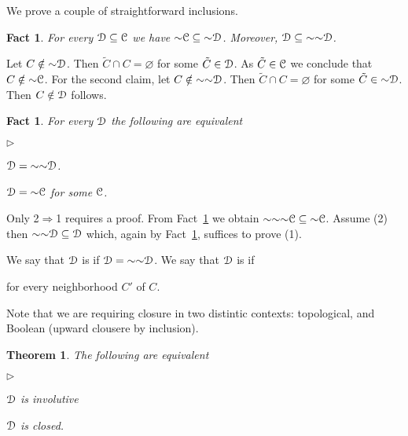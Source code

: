 \documentclass{amsproc}
\makeatletter
\newcommand{\mylabel}[1]{{#1}\hfill}
\renewenvironment{itemize}
  {\begin{list}{$\triangleright$}{%
  \setlength{\parskip}{0mm}
  \setlength{\topsep}{.1\baselineskip}
  \setlength{\rightmargin}{0mm}
  \setlength{\listparindent}{0mm}
  \setlength{\itemindent}{0mm}
  \setlength{\labelwidth}{3ex}
  \setlength{\itemsep}{.1\baselineskip}
  \setlength{\parsep}{.1\baselineskip}
  \setlength{\partopsep}{0mm}
  \setlength{\labelsep}{1ex}
  \setlength{\leftmargin}{\labelwidth+\labelsep}
  \let\makelabel\mylabel}}{%
\end{list}}
\newcounter{thm}
\theoremstyle{mio}
\newtheorem{theorem}[thm]{Theorem}\tcolorboxenvironment{theorem}{mythm}
\newtheorem{fact}[thm]{Fact}\tcolorboxenvironment{fact}{mythm}
\providecommand{\proofNameStyle}{\bfseries}
\renewenvironment{proof}[1][\proofname]{\par
  \pushQED{\qed}%
  \normalfont%
  \trivlist
  \item[\hskip\labelsep
        \proofNameStyle
    #1\@addpunct{.}]\ignorespaces
}{%
  \popQED\endtrivlist\@endpefalse
}
\renewcommand*{\emph}[1]{%
   \smash{\tikz[baseline]\node[rectangle, fill=teal!25, rounded corners, inner xsep=0.5ex, inner ysep=0.2ex, anchor=base, minimum height = 2.7ex]{\strut #1};}}
\makeatother
\begin{document}
We prove a couple of straightforward inclusions.

\begin{fact}\label{fact_~inclusione}
  For every ${\EuScript D}\subseteq{\EuScript C}$ we have ${\sim}{\EuScript C}\subseteq{\sim}{\EuScript D}$.  
  Moreover, ${\EuScript D}\subseteq{\sim}{\sim}{\EuScript D}$.
\end{fact}

\begin{proof}
  Let $C\notin{\sim}{\EuScript D}$.
  Then $\tilde C\cap C=\varnothing$ for some $\tilde C\in{\EuScript D}$.
  As  $\tilde C\in{\EuScript C}$ we conclude that  $C\notin{\sim}{\EuScript C}$.
  For the second claim, let $C\notin{\sim}{\sim}{\EuScript D}$.
  Then $\tilde C\cap C=\varnothing$ for some $\tilde C\in{\sim}{\EuScript D}$.
  Then $C\notin{\EuScript D}$ follows.
\end{proof}

\begin{fact}
  For every ${\EuScript D}$ the following are equivalent
  \begin{itemize}
    \item [1.] ${\EuScript D}={\sim}{\sim}{\EuScript D}$.
    \item [2.] ${\EuScript D}={\sim}{\EuScript C}$ for some ${\EuScript C}$.
  \end{itemize}
\end{fact}
  
\begin{proof}
  Only 2$\Rightarrow$1 requires a proof.
  From Fact~\ref{fact_~inclusione} we obtain ${\sim}{\sim}{\sim}{\EuScript C}\subseteq{\sim}{\EuScript C}$.
  Assume (2) then ${\sim}{\sim}{\EuScript D}\subseteq{\EuScript D}$ which, again by Fact~\ref{fact_~inclusione}, suffices to prove (1).
\end{proof}

We say that ${\EuScript D}$ is \emph{involutive\/} if ${\EuScript D}={\sim}{\sim}{\EuScript D}$.
We say that ${\EuScript D}$ is \emph{closed\/} if 

\hfill for every neighborhood $C'$ of $C$.

Note that we are requiring closure in two distintic contexts: topological, and Boolean (upward clousere by inclusion).


\begin{theorem}
  The following are equivalent
  \begin{itemize}
    \item [1.] ${\EuScript D}$ is involutive 
    \item [2.] ${\EuScript D}$ is closed.
  \end{itemize}
\end{theorem}
\end{document}
